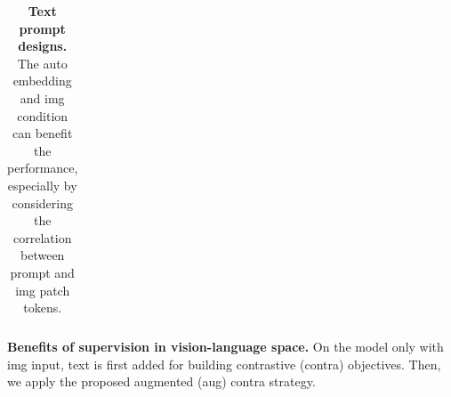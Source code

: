 \documentclass[10pt,twocolumn,letterpaper]{article}
\begin{document}
\begin{table}[t]
\begin{subtable}[t]{0.25\textwidth}
{\begin{tabular}{c|cc}
        \end{tabular}}
        \label{tab:ablationfreq}
    \end{subtable}
    \hfill
    \begin{subtable}[t]{0.35\textwidth}
        \centering
        \renewcommand\arraystretch{1.0}
        \caption{\textbf{Benefits of supervision in vision-language space.} On the model only with img input, text is first added for building contrastive (contra) objectives. Then, we apply the proposed augmented (aug) contra strategy.}
        \label{tab:ablationvisonlanguagespace}
     \end{subtable}
     \hfill
     \begin{subtable}[t]{0.42\textwidth}
        \centering
        \renewcommand\arraystretch{1.0}
        \vspace{2mm}
        \caption{\textbf{Text prompt designs.} The auto embedding and img condition can benefit the performance, especially by considering the correlation between prompt and img patch tokens.}
        \label{tab:ablationpromptdesign}

\end{subtable}
\end{table}
\end{document}
